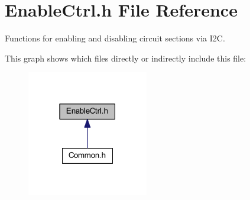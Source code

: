 \hypertarget{a00023}{\section{Enable\-Ctrl.\-h File Reference}
\label{a00023}
}


Functions for enabling and disabling circuit sections via I2\-C.  


This graph shows which files directly or indirectly include this file\-:\nopagebreak
\begin{figure}[H]
\begin{center}
\leavevmode
\includegraphics[width=150pt]{a00064}
\end{center}
\end{figure}
